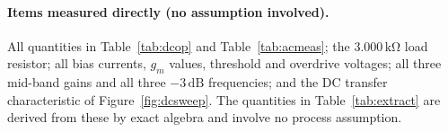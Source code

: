 \documentclass[12pt,a4paper]{article}
\newcommand{\U}[1]{\,\mathrm{#1}}
\begin{document}
\paragraph{Items measured directly (no assumption involved).}
All quantities in Table~\ref{tab:dcop} and Table~\ref{tab:acmeas}; the
$3.000\U{k\Omega}$ load resistor; all bias currents, $g_m$ values, threshold
and overdrive voltages; all three mid-band gains and all three $-3\U{dB}$
frequencies; and the DC transfer characteristic of Figure~\ref{fig:dcsweep}.
The quantities in Table~\ref{tab:extract} are derived from these by exact
algebra and involve no process assumption.
\end{document}
